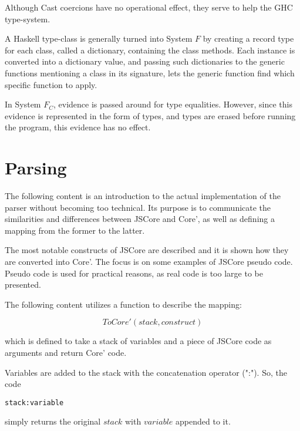 Although Cast coercions have no operational effect, they serve to help the
GHC type-system.


A Haskell type-class is generally turned into System $F$ by creating a 
record type for each class, called a dictionary, containing the class methods.
Each instance is converted into a dictionary value, and passing such 
dictionaries to the generic functions mentioning a class in its signature,
lets the generic function find which specific function to apply.
\cite{sulzmann2007system}


In System $F_C$, evidence is passed around for type equalities. However,
since this evidence is represented in the form of types, and types are
erased before running the program, this evidence has no effect.
\cite{sulzmann2007system}

\section{Parsing}

The following content is an introduction to the actual implementation
of the parser without becoming too technical. Its purpose is to communicate
the similarities and differences between JSCore 
and Core', as well as defining a mapping from the former to the latter.

The most notable constructs of JSCore are described and it is shown how they
are converted into Core'. The focus is on some examples of JSCore pseudo code.
Pseudo code is used for practical reasons, as real code is too large to be 
presented.

The following content utilizes a function to describe the mapping:

\begin{equation*}
ToCore'(stack, construct)
\end{equation*}

which is defined to take a stack of variables and a piece of JSCore code 
as arguments and return Core' code. 

Variables are added to the stack with the concatenation operator (":"). 
So, the code 
\lstset{ %
language=Haskell,
}
\begin{lstlisting}
stack:variable 
\end{lstlisting}
simply returns the original $stack$ with $variable$ appended to it.

